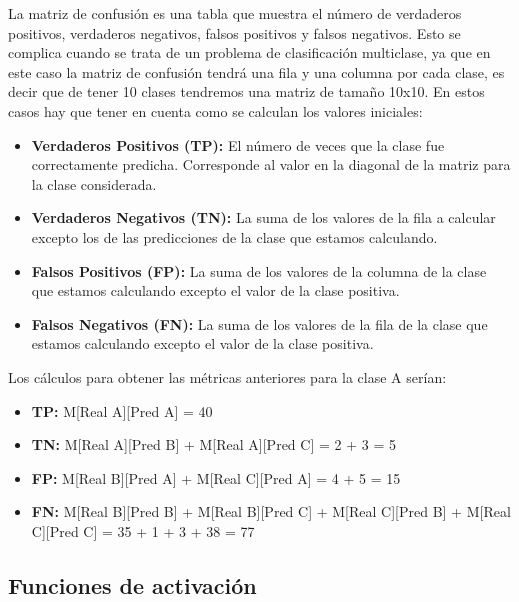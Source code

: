 La matriz de confusión es una tabla que muestra el número de verdaderos positivos, verdaderos negativos, falsos positivos y falsos negativos.
Esto se complica cuando se trata de un problema de clasificación multiclase\cite{medium:multiclass-classification}, ya que en este caso la matriz de confusión tendrá una fila y una columna por cada clase, es decir que de tener 10 clases tendremos una matriz de tamaño 10x10.
En estos casos hay que tener en cuenta como se calculan los valores iniciales:

\begin{itemize}
	\item \textbf{Verdaderos Positivos (TP):} El número de veces que la clase fue correctamente predicha. Corresponde al valor en la diagonal de la matriz para la clase considerada.
	\item \textbf{Verdaderos Negativos (TN):} La suma de los valores de la fila a calcular excepto los de las predicciones de la clase que estamos calculando.
	\item \textbf{Falsos Positivos (FP):} La suma de los valores de la columna de la clase que estamos calculando excepto el valor de la clase positiva.
	\item \textbf{Falsos Negativos (FN):} La suma de los valores de la fila de la clase que estamos calculando excepto el valor de la clase positiva.
\end{itemize}


Los cálculos para obtener las métricas anteriores para la clase A serían:

\begin{itemize}
	\item \textbf{TP:} M[Real A][Pred A] = 40
	\item \textbf{TN:} M[Real A][Pred B] + M[Real A][Pred C] = 2 + 3 = 5
	\item \textbf{FP:} M[Real B][Pred A] + M[Real C][Pred A] = 4 + 5 = 15
	\item \textbf{FN:} M[Real B][Pred B] + M[Real B][Pred C] + M[Real C][Pred B] + M[Real C][Pred C] = 35 + 1 + 3 + 38 = 77
\end{itemize}

\subsection{Funciones de activación}

